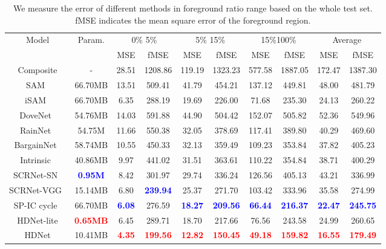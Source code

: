\documentclass[sigconf]{acmart}
\begin{document}
\begin{table*}[t]
	\centering
	\begin{tabular}{cccccccccc}
		\toprule
		\multirow{2}{*}{Model} &\multirow{2}{*}{Param.} & \multicolumn{2}{c}{0\% 5\%} & \multicolumn{2}{c}{5\% 15\%} & \multicolumn{2}{c}{15\%100\%} &  \multicolumn{2}{c}{Average} \\ \cline{3-10}
		&&MSE&fMSE&MSE&fMSE&MSE&fMSE&MSE&fMSE\\
		\midrule
		Composite&-&28.51&1208.86&119.19&1323.23&577.58&1887.05 &172.47&1387.30\\
SAM~\cite{SSAM}&66.70MB&13.51&509.41&41.79&454.21&137.12&449.81&48.00&481.79 \\
		iSAM~\cite{sofiiuk2021foreground}&66.70MB& 6.35& 288.19&19.69 &226.00& 71.68&235.30&  24.13&260.22\\
		DoveNet~\cite{DoveNet}&54.76MB&14.03&591.88 & 44.90&504.42&152.07&505.82&52.36&549.96\\
		RainNet~\cite{RAIN}&54.75M&11.66&550.38& 32.05 &378.69&117.41&389.80&40.29&469.60\\
		
		BargainNet~\cite{Bargainnet}&58.74MB& 10.55 & 450.33 & 32.13 & 359.49 & 109.23 & 353.84 & 37.82 & 405.23\\ 
		Intrinsic~\cite{GuoZJGZ21} &40.86MB&9.97& 441.02&31.51&363.61 &110.22 & 354.84 &38.71& 400.29 \\
		SCRNet-SN~\cite{liang2021spatial}&\textbf{\textcolor{blue}{0.95M}} &8.42 &301.97& 29.74& 336.24& 126.56& 405.13& 43.21 &336.99\\
		SCRNet-VGG~\cite{liang2021spatial}&15.14MB &6.80& \textbf{\textcolor{blue}{239.94}}& 25.37& 271.70 &103.42 &333.96 &35.58 &274.99 \\
		SP-IC cycle~\cite{cai2023structure}& 66.70MB &\textbf{\textcolor{blue}{6.08}} &276.59 & \textbf{\textcolor{blue}{18.27}}&\textbf{\textcolor{blue}{209.56}}& \textbf{\textcolor{blue}{66.44}}& \textbf{\textcolor{blue}{216.37}}&\textbf{\textcolor{blue}{22.47}}&\textbf{\textcolor{blue}{245.75}}  \\
		\midrule
		HDNet-lite&\textbf{\textcolor{red}{0.65MB}}& 6.45&289.71&18.70& 217.66& 76.56&243.58&24.99& 260.65\\
		HDNet&10.41MB&\textbf{\textcolor{red}{4.35}}&\textbf{\textcolor{red}{199.56}}&\textbf{\textcolor{red}{12.82}}&\textbf{\textcolor{red}{150.45}}&\textbf{\textcolor{red}{49.18}}&\textbf{\textcolor{red}{159.82}}&\textbf{\textcolor{red}{16.55}}&\textbf{\textcolor{red}{179.49}}\\
		\bottomrule
	\end{tabular}
	\caption{We measure the error of different methods in foreground ratio range based on the whole test set. fMSE indicates the mean square error of the foreground region.}
	\label{tab:my_label}
\end{table*}
\end{document}

